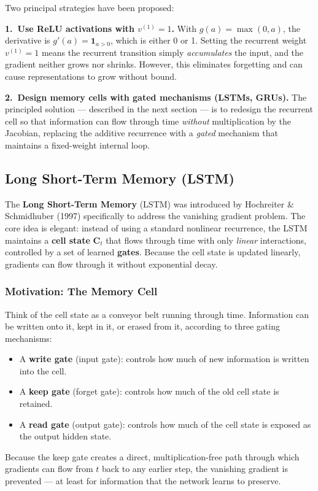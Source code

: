 \documentclass[11pt,a4paper]{article}
\newcommand{\term}[1]{\textcolor{DefGreen}{\textbf{#1}}}
\begin{document}
Two principal strategies have been proposed:

\textbf{1.\ Use ReLU activations with $v^{(1)} = 1$.}
With $g(a) = \max(0, a)$, the derivative is $g'(a) = \mathbf{1}_{a > 0}$, which is either 0 or 1. Setting the recurrent weight $v^{(1)} = 1$ means the recurrent transition simply \emph{accumulates} the input, and the gradient neither grows nor shrinks. However, this eliminates forgetting and can cause representations to grow without bound.

\textbf{2.\ Design memory cells with gated mechanisms (LSTMs, GRUs).}
The principled solution — described in the next section — is to redesign the recurrent cell so that information can flow through time \emph{without} multiplication by the Jacobian, replacing the additive recurrence with a \emph{gated} mechanism that maintains a fixed-weight internal loop.

\subsection{Long Short-Term Memory (LSTM)}
\label{sec:lstm}

The \term{Long Short-Term Memory} (LSTM) was introduced by Hochreiter \& Schmidhuber (1997) specifically to address the vanishing gradient problem. The core idea is elegant: instead of using a standard nonlinear recurrence, the LSTM maintains a \term{cell state} $\mathbf{C}_t$ that flows through time with only \emph{linear} interactions, controlled by a set of learned \term{gates}. Because the cell state is updated linearly, gradients can flow through it without exponential decay.

\subsubsection{Motivation: The Memory Cell}

Think of the cell state as a conveyor belt running through time. Information can be written onto it, kept in it, or erased from it, according to three gating mechanisms:
\begin{itemize}
  \item A \textbf{write gate} (input gate): controls how much of new information is written into the cell.
  \item A \textbf{keep gate} (forget gate): controls how much of the old cell state is retained.
  \item A \textbf{read gate} (output gate): controls how much of the cell state is exposed as the output hidden state.
\end{itemize}
Because the keep gate creates a direct, multiplication-free path through which gradients can flow from $t$ back to any earlier step, the vanishing gradient is prevented — at least for information that the network learns to preserve.
\end{document}
